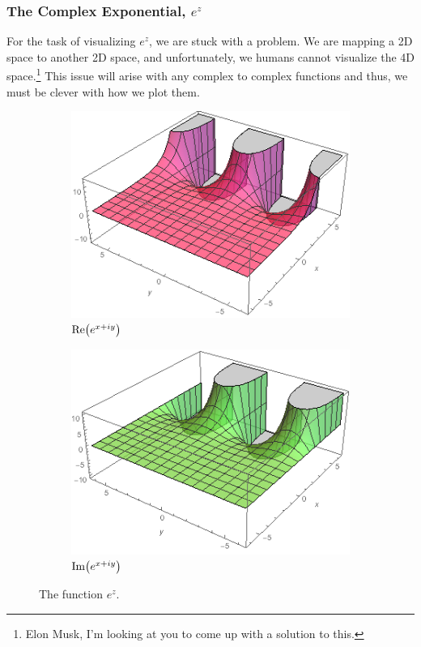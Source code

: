 \documentclass[10pt]{scrartcl}
\numberwithin{equation}{subsection}
\theoremstyle{definition}
\theoremstyle{remark}
\newcommand{\ReP}[1]{
		\mathrm{Re}\pqty{#1}
	}
\newcommand{\ImP}[1]{
		\mathrm{Im}\pqty{#1}
	}
\begin{document}
\subsubsection{The Complex Exponential, $e^z$}
For the task of visualizing $e^z$, we are stuck with a problem. We are mapping
a 2D space to another 2D space, and unfortunately, we humans cannot visualize
the 4D space.\footnote{Elon Musk, I'm looking at you to come up with a solution
to this.} This issue will arise with any complex to complex functions and thus,
we must be clever with how we plot them.
\begin{figure}
	\centering
	\begin{subfigure}[b]{.4\textwidth}
		\includegraphics[width=\textwidth]{exponential_Re}
		\caption{$\ReP{e^{x+iy}}$}
	\end{subfigure}
	\begin{subfigure}[b]{.4\textwidth}
		\includegraphics[width=\textwidth]{exponential_Im}
		\caption{$\ImP{e^{x+iy}}$}
	\end{subfigure}
	\caption{The function $e^z$.}
	\label{fig:Re_Im_exp}
\end{figure}
\end{document}
